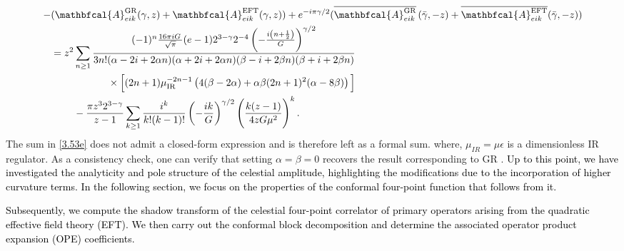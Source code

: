 \begin{align}
\begin{split}\label{3.53e}
 \hspace{0cm}-&(\mathbfcal{A}_{eik}^{\textrm{GR}}(\gamma,z)+\mathbfcal{A}_{eik}^{\textrm{EFT}}(\gamma,z))+e^{-i\pi \gamma/2}(\overline{\mathbfcal{A}_{eik}^{\textrm{GR}}}\left(\bar \gamma,-z\right)+\overline{\mathbfcal{A}_{eik}^{\textrm{EFT}}}(\bar\gamma,-z)) \\&=z^2\sum_{n\geq 1}\frac{(-1)^n \frac{16\pi i G \,}{\sqrt{\pi}}(e-1)2^{3-\gamma} 2^{-4} \left(-\frac{i \left(n+\frac{1}{2}\right)}{G}\right)^{\gamma /2}}{3 n! (\alpha -2 i  +2 \alpha  n) (\alpha +2 i  +2 \alpha  n) (\beta -i +2 \beta  n) (\beta +i  +2 \beta  n)}\\ &\hspace{2 cm}\times\Big[(2 n+1) \mu _{\text{IR}}^{-2 n-1} \left(4  (\beta -2 \alpha )+\alpha  \beta  (2 n+1)^2 (\alpha -8 \beta )\right)\Big]\\&
\hspace{0.8cm}-\frac{\pi z^3 2^{3-\gamma}}{z-1}\sum_{k\geq 1}\frac{i^k}{k!(k-1)!}\left(-\frac{i k}{G}\right)^{\gamma/2}\Bigg(\frac{k(z-1)}{4zG\mu^2}\Bigg)^k\,.
 \end{split} 
\end{align}
The sum in \eqref{3.53e} does not admit a closed-form expression and is therefore left as a formal sum.
where, $\mu_{IR}=\mu\epsilon$ is a dimensionless IR regulator. As a consistency check, one can verify that setting $\alpha=\beta=0$ recovers the result corresponding to GR \cite{Adamo:2024mqn}. \textcolor{black}{
Up to this point, we have investigated the analyticity and pole structure of the celestial amplitude, highlighting the modifications due to the incorporation of higher curvature terms. In the following section, we focus on the properties of the conformal four-point function that follows from it.}
\par
\textcolor{black}{
Subsequently, we compute the shadow transform of the celestial four-point correlator of primary operators arising from the quadratic effective field theory (EFT). We then carry out the conformal block decomposition and determine the associated operator product expansion (OPE) coefficients. } %
